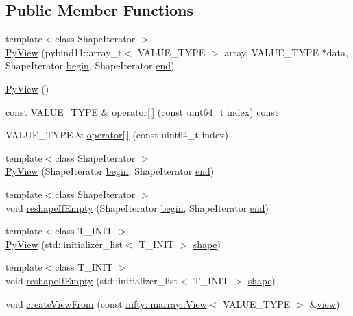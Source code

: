 \subsection*{Public Member Functions}
\begin{DoxyCompactItemize}
\item 
{\footnotesize template$<$class Shape\+Iterator $>$ }\\\hyperlink{classnifty_1_1marray_1_1PyView_a1c3e1533712d9197ebcdbfded78532e8}{Py\+View} (pybind11\+::array\+\_\+t$<$ V\+A\+L\+U\+E\+\_\+\+T\+Y\+PE $>$ array, V\+A\+L\+U\+E\+\_\+\+T\+Y\+PE $\ast$data, Shape\+Iterator \hyperlink{classandres_1_1View_acd1f71e27ea01d536e1539877afedfa9}{begin}, Shape\+Iterator \hyperlink{classandres_1_1View_af778a1e9839f2f90e503514e36d41b78}{end})
\item 
\hyperlink{classnifty_1_1marray_1_1PyView_afe98775fe6a9b821f3e98f97b352f980}{Py\+View} ()
\item 
const V\+A\+L\+U\+E\+\_\+\+T\+Y\+PE \& \hyperlink{classnifty_1_1marray_1_1PyView_a6a8eba72c1a16c0c93518fb56d9033f1}{operator\mbox{[}$\,$\mbox{]}} (const uint64\+\_\+t index) const
\item 
V\+A\+L\+U\+E\+\_\+\+T\+Y\+PE \& \hyperlink{classnifty_1_1marray_1_1PyView_a64d9ff12fbe42e31b957b63180fceb82}{operator\mbox{[}$\,$\mbox{]}} (const uint64\+\_\+t index)
\item 
{\footnotesize template$<$class Shape\+Iterator $>$ }\\\hyperlink{classnifty_1_1marray_1_1PyView_aceeb7d7fb74e9dad8a6d930440dfb780}{Py\+View} (Shape\+Iterator \hyperlink{classandres_1_1View_acd1f71e27ea01d536e1539877afedfa9}{begin}, Shape\+Iterator \hyperlink{classandres_1_1View_af778a1e9839f2f90e503514e36d41b78}{end})
\item 
{\footnotesize template$<$class Shape\+Iterator $>$ }\\void \hyperlink{classnifty_1_1marray_1_1PyView_a2141d44a685df3c8f24afafc76c86197}{reshape\+If\+Empty} (Shape\+Iterator \hyperlink{classandres_1_1View_acd1f71e27ea01d536e1539877afedfa9}{begin}, Shape\+Iterator \hyperlink{classandres_1_1View_af778a1e9839f2f90e503514e36d41b78}{end})
\item 
{\footnotesize template$<$class T\+\_\+\+I\+N\+IT $>$ }\\\hyperlink{classnifty_1_1marray_1_1PyView_a2a86aa379876d3ed5d81ed3b42bd094f}{Py\+View} (std\+::initializer\+\_\+list$<$ T\+\_\+\+I\+N\+IT $>$ \hyperlink{classandres_1_1View_a981d648b453590bed7026754b09dbaba}{shape})
\item 
{\footnotesize template$<$class T\+\_\+\+I\+N\+IT $>$ }\\void \hyperlink{classnifty_1_1marray_1_1PyView_a88cd936f03f7f4ba07ee7eb4dce4f6eb}{reshape\+If\+Empty} (std\+::initializer\+\_\+list$<$ T\+\_\+\+I\+N\+IT $>$ \hyperlink{classandres_1_1View_a981d648b453590bed7026754b09dbaba}{shape})
\item 
void \hyperlink{classnifty_1_1marray_1_1PyView_abd0258ab2bf010a8b2fb07143161bf78}{create\+View\+From} (const \hyperlink{classandres_1_1View}{nifty\+::marray\+::\+View}$<$ V\+A\+L\+U\+E\+\_\+\+T\+Y\+PE $>$ \&\hyperlink{classandres_1_1View_a7c7ea156cd617f1b0791a96892036247}{view})
\end{DoxyCompactItemize}
